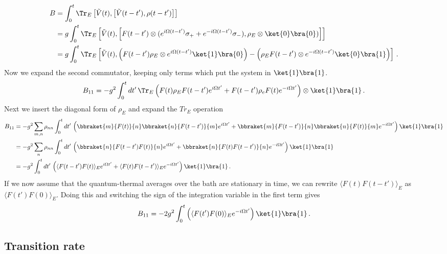 \begin{align}
B
&= \int_0^t \Tr_E \left[ \tilde{V}(t), \left[ \tilde{V}(t-t'), \rho(t-t') \right] \right] \\
&= g \int_0^t \Tr_E \left[ \tilde{V}(t),
\left[ F(t-t')
\otimes (e^{i \Omega (t-t')} \sigma_+ + e^{-i \Omega (t-t')} \sigma_-),
\rho_E \otimes \ket{0}\bra{0} ) \right] \right] \\
&= g \int_0^t \Tr_E \left[ \tilde{V}(t),
\left( F(t-t')\rho_E \otimes e^{i \Omega (t-t')} \ket{1}\bra{0} \right)
- \left( \rho_E F(t-t') \otimes e^{-i \Omega (t-t')} \ket{0}\bra{1} \right)
\right] \, . 
\end{align}
Now we expand the second commutator, keeping only terms which put the system in $\ket{1}\bra{1}$.
\begin{equation}
B_{11}
= - g^2 \int_0^t dt' \, \Tr_E \left(
F(t) \rho_E F(t-t') e^{i \Omega t'} 
+ F(t-t') \rho_e F(t) e^{-i \Omega t'}
\right) \otimes \ket{1}\bra{1} \, .
\end{equation}
Next we insert the diagonal form of $\rho_E$ and expand the $Tr_E$ operation
\begin{align}
B_{11}
&= - g^2 \sum_{m,n} \rho_{nn} \int_0^t dt' \,
\left(
\bbraket{m}{F(t)}{n} \bbraket{n}{F(t-t')}{m}e^{i \Omega t'} +
\bbraket{m}{F(t-t')}{n} \bbraket{n}{F(t)}{m} e^{-i \Omega t'}
\right) \ket{1}\bra{1} \\
&= - g^2 \sum_n \rho_{nn} \int_0^t dt' \, \left(
\bbraket{n}{F(t-t')F(t)}{n} e^{i \Omega t'}
+ \bbraket{n}{F(t)F(t-t')}{n} e^{-i \Omega t'}
\right) \ket{1}\bra{1} \\
&= - g^2 \int_0^t dt' \, \left(
\langle F(t-t') F(t) \rangle_E e^{i \Omega t'} +
\langle F(t) F(t-t') \rangle_E e^{-i \Omega t'}
\right) \ket{1}\bra{1} \, .
\end{align}
If we now assume that the quantum-thermal averages over the bath are stationary in time, we can rewrite \mbox{$\langle F(t) F(t-t') \rangle_E$} as \mbox{$\langle F(t')F(0) \rangle_E$}.
Doing this and switching the sign of the integration variable in the first term gives
\begin{equation}
B_{11} = - 2 g^2 \int_0^t \left(
\langle F(t')F(0) \rangle_E e^{-i \Omega t'} \right)
\ket{1}\bra{1} \, .
\end{equation}


\subsection{Transition rate}

